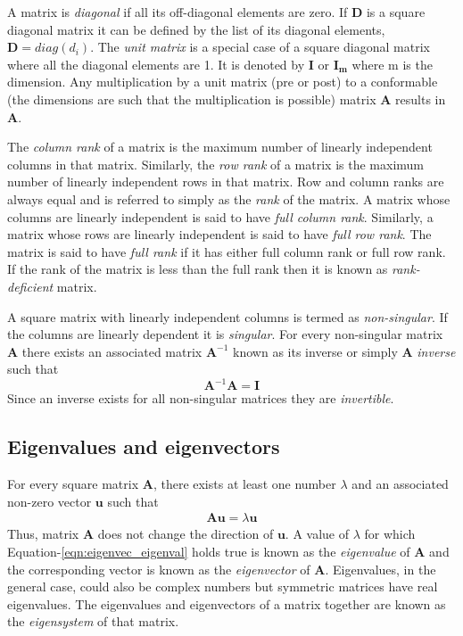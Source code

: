 A matrix is \textit{diagonal} if all its off-diagonal elements are zero. If $\mathbf{D}$ is a square diagonal matrix it can be defined by the list of its diagonal elements, $\mathbf{D}=diag(d_{i})$. The \textit{unit matrix} is a special case of a square diagonal matrix where all the diagonal elements are 1. It is denoted by $\mathbf{I}$ or $\mathbf{I_{m}}$ where m is the dimension. Any multiplication by a unit matrix (pre or post) to a conformable (the dimensions are such that the multiplication is possible) matrix $\mathbf{A}$ results in $\mathbf{A}$.

The \textit{column rank} of a matrix is the maximum number of linearly independent columns in that matrix. Similarly, the \textit{row rank} of a matrix is the maximum number of linearly independent rows in that matrix. Row and column ranks are always equal and is referred to simply as the \textit{rank} of the matrix. A matrix whose columns are linearly independent is said to have \textit{full column rank}. Similarly, a matrix whose rows are linearly independent is said to have \textit{full row rank}. The matrix is said to have \textit{full rank} if it has either full column rank or full row rank. If the rank of the matrix is less than the full rank then it is known as \textit{rank-deficient} matrix.
 
A square matrix with linearly independent columns is termed as \textit{non-singular}. If the columns are linearly dependent it is \textit{singular}. For every non-singular matrix $\mathbf{A}$ there exists an associated matrix $\mathbf{A}^{-1}$ known as its inverse or simply $\mathbf{A}$ \textit{inverse} such that
\begin{displaymath}
    \mathbf{A}^{-1}\mathbf{A} = \mathbf{I}
\end{displaymath}
Since an inverse exists for all non-singular matrices they are \textit{invertible}.

\subsection{Eigenvalues and eigenvectors} \label{eigval_eigvec}
For every square matrix $\mathbf{A}$, there exists at least one number $\lambda$ and an associated non-zero vector $\mathbf{u}$ such that 
\begin{eqnarray}
    \mathbf{Au} = \lambda \mathbf{u} \label{eqn:eigenvec_eigenval}
\end{eqnarray}
Thus, matrix $\mathbf{A}$ does not change the direction of $\mathbf{u}$. A value of $\lambda$ for which Equation-\ref{eqn:eigenvec_eigenval} holds true is known as the \textit{eigenvalue} of $\mathbf{A}$ and the corresponding vector is known as the \textit{eigenvector} of $\mathbf{A}$. Eigenvalues, in the general case, could also be complex numbers but symmetric matrices have real eigenvalues. The eigenvalues and eigenvectors of a matrix together are known as the \textit{eigensystem} of that matrix.

